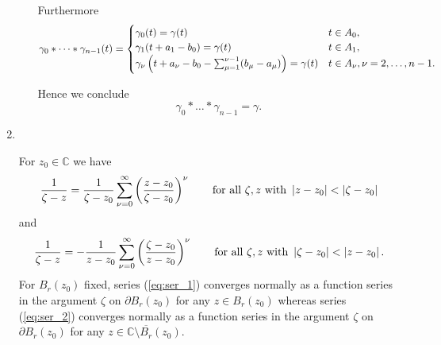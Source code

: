 \begin{enumerate}[label = \textbf{Exercise \arabic*.},wide = 0pt, itemsep=1.5ex]
\begin{enumerate}[label = (\alph*),wide = 0pt, itemsep=1.5ex]
			Furthermore
			\begin{align*}
				\gamma_0 \ast \dots \ast \gamma_{n-1}(t) = \begin{cases}
					\gamma_0(t) = \gamma(t) & t \in A_0,\\
					\gamma_1(t + a_1 - b_0) = \gamma(t) & t \in A_1,\\	
					\gamma_\nu\del{t + a_\nu - b_0 - \sum_{\mu = 1}^{\nu-1} (b_\mu - a_\mu)} = \gamma(t) & t \in A_\nu, \nu = 2,\dots,n - 1.
				\end{cases}
			\end{align*}

			Hence we conclude
			\begin{equation}
				\gamma_{0} \ast \dots \ast \gamma_{n-1} = \gamma.
			\end{equation}
	\end{enumerate}
\item 
	~
	\begin{lemma}
		For $z_0 \in \mathbb{C}$ we have
		\begin{equation}
			\frac{1}{\zeta - z} = \frac{1}{\zeta - z_0} \sum_{\nu = 0}^\infty \del{\frac{z - z_0}{\zeta - z_0}}^{\nu} \qquad \text{for all } \zeta,z \text{ with } \abs[0]{z - z_0} < \abs[0]{\zeta - z_0}
			\label{eq:ser_1}
		\end{equation}
		\noindent and
		\begin{equation}
			\frac{1}{\zeta - z} = -\frac{1}{z - z_0} \sum_{\nu = 0}^\infty \del{\frac{\zeta - z_0}{z - z_0}}^{\nu} \qquad \text{for all } \zeta,z \text{ with } \abs[0]{\zeta - z_0} < \abs[0]{z - z_0}.
			\label{eq:ser_2}
		\end{equation}
		For $B_r(z_0)$ fixed, series (\ref{eq:ser_1}) converges normally as a function series in the argument $\zeta$ on $\partial B_r(z_0)$ for any $z \in B_r(z_0)$ whereas series (\ref{eq:ser_2}) converges normally as a function series in the argument $\zeta$ on $\partial B_r(z_0)$ for any $z \in \mathbb{C} \setminus \overline{B_r}(z_0)$.
		\label{lem:geo}
	\end{lemma}


\end{enumerate}
